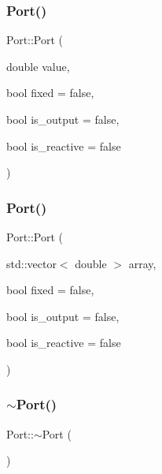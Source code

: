 \mbox{\label{class_port_abc59e965682f281264a8488a46408a6f}} 
\subsubsection{\texorpdfstring{Port()}{Port()}\hspace{0.1cm}{\footnotesize\ttfamily [2/3]}}
{\footnotesize\ttfamily Port\+::\+Port (\begin{DoxyParamCaption}\item[{double}]{value,  }\item[{bool}]{fixed = {\ttfamily false},  }\item[{bool}]{is\+\_\+output = {\ttfamily false},  }\item[{bool}]{is\+\_\+reactive = {\ttfamily false} }\end{DoxyParamCaption})\hspace{0.3cm}{\ttfamily [inline]}}

\mbox{\label{class_port_a7eb1db139cc954b15e0d182ad3244067}} 
\subsubsection{\texorpdfstring{Port()}{Port()}\hspace{0.1cm}{\footnotesize\ttfamily [3/3]}}
{\footnotesize\ttfamily Port\+::\+Port (\begin{DoxyParamCaption}\item[{std\+::vector$<$ double $>$}]{array,  }\item[{bool}]{fixed = {\ttfamily false},  }\item[{bool}]{is\+\_\+output = {\ttfamily false},  }\item[{bool}]{is\+\_\+reactive = {\ttfamily false} }\end{DoxyParamCaption})\hspace{0.3cm}{\ttfamily [inline]}}

\mbox{\label{class_port_aff000f05612ddb41fec4bff9087bb643}} 
\subsubsection{\texorpdfstring{$\sim$\+Port()}{~Port()}}
{\footnotesize\ttfamily Port\+::$\sim$\+Port (\begin{DoxyParamCaption}{ }\end{DoxyParamCaption})\hspace{0.3cm}{\ttfamily [default]}}



